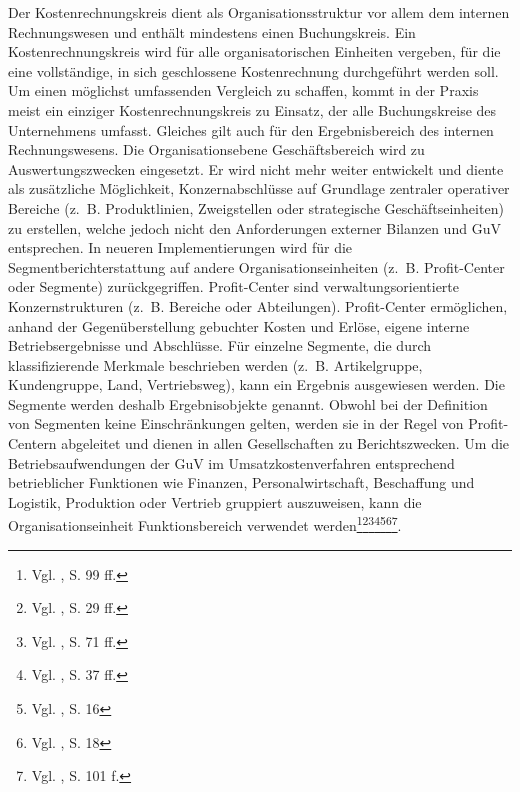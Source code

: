 Der Kostenrechnungskreis dient als Organisationsstruktur vor allem dem internen Rechnungswesen und enthält mindestens einen Buchungskreis. Ein Kostenrechnungskreis wird für alle organisatorischen Einheiten vergeben, für die eine vollständige, in sich geschlossene Kostenrechnung durchgeführt werden soll. Um einen möglichst umfassenden Vergleich zu schaffen, kommt in der Praxis meist ein einziger Kostenrechnungskreis zu Einsatz, der alle Buchungskreise des Unternehmens umfasst. Gleiches gilt auch für den Ergebnisbereich des internen Rechnungswesens.
Die Organisationsebene Geschäftsbereich wird zu Auswertungszwecken eingesetzt. Er wird nicht mehr weiter entwickelt und diente als zusätzliche Möglichkeit, Konzernabschlüsse auf Grundlage zentraler operativer Bereiche (z.~B. Produktlinien, Zweigstellen oder strategische Geschäftseinheiten) zu erstellen, welche jedoch nicht den Anforderungen externer Bilanzen und GuV entsprechen. In neueren Implementierungen wird für die Segmentberichterstattung auf andere Organisationseinheiten (z.~B. Profit-Center oder Segmente) zurückgegriffen.
Profit-Center sind verwaltungsorientierte Konzernstrukturen (z.~B. Bereiche oder Abteilungen). Profit-Center ermöglichen, anhand der Gegenüberstellung gebuchter Kosten und Erlöse, eigene interne Betriebsergebnisse und Abschlüsse.
Für einzelne Segmente, die durch klassifizierende Merkmale beschrieben werden (z.~B. Artikelgruppe, Kundengruppe, Land, Vertriebsweg), kann ein Ergebnis ausgewiesen werden. Die Segmente werden deshalb Ergebnisobjekte genannt. Obwohl bei der Definition von Segmenten keine Einschränkungen gelten, werden sie in der Regel von Profit-Centern abgeleitet und dienen in allen Gesellschaften zu Berichtszwecken. 
Um die Betriebsaufwendungen der GuV im Umsatzkostenverfahren entsprechend betrieblicher Funktionen wie Finanzen, Personalwirtschaft, Beschaffung und Logistik, Produktion oder Vertrieb gruppiert auszuweisen, kann die Organisationseinheit Funktionsbereich verwendet werden\footnote{Vgl. \cite{Hefner2001}, S. 99 ff.}\footnote{Vgl. \cite{Friedl2008}, S. 29 ff.}\footnote{Vgl. \cite{Maassen2006}, S. 71 ff.}\footnote{Vgl. \cite{Patel2009}, S. 37 ff.}\footnote{Vgl. \cite{Padhi2011}, S. 16}\footnote{Vgl. \cite{SAPFI2001}, S. 18}\footnote{Vgl. \cite{Jandt2008}, S. 101 f.}.


